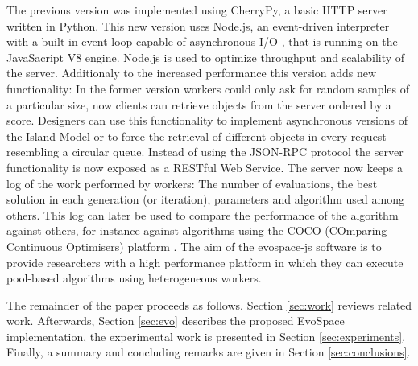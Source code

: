 The previous version %
was implemented using CherryPy, a basic HTTP 
server written in Python. This new version uses Node.js, an 
event-driven interpreter with a built-in event loop capable of
asynchronous I/O \cite{tilkov2010node}, that is 
running on the JavaSacript V8 engine. Node.js is used 
to optimize throughput and scalability of the server. %
Additionaly to the  increased performance this version 
adds new functionality: In the former version workers could only
ask for random samples of a particular size, now clients 
can retrieve objects from the server ordered by a score. 
Designers can use this functionality to implement 
asynchronous versions of the Island Model or to force 
the retrieval of different objects in every request 
resembling a circular queue. Instead of using the JSON-RPC 
protocol the server functionality is now exposed as a RESTful 
Web Service. The server now keeps a log of the work performed 
by workers: The number of evaluations, the best solution in each 
generation (or iteration), parameters and algorithm used among others.
This log can later be used to compare the performance of 
the algorithm against others, for instance against 
algorithms using the COCO (COmparing Continuous Optimisers)
platform \cite{hansen2016coco}.
The aim of the {\sf evospace-js} software is to provide 
researchers with a high performance platform in which 
they can execute pool-based algorithms using heterogeneous workers. 

The remainder of the paper proceeds as follows. Section \ref{sec:work} 
reviews related work. Afterwards, Section \ref{sec:evo} describes the
proposed EvoSpace implementation, the experimental work is presented in 
Section \ref{sec:experiments}. Finally, a summary and 
concluding remarks are given in Section \ref{sec:conclusions}.



